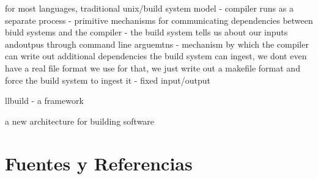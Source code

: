 \documentclass[12pt, a4paper]{report}
\begin{document}
for most languages, traditional unix/build system model
- compiler runs as a separate process
- primitive mechanisms for communicating dependencies between biuld systems and the compiler
  - the build system tells us about our inputs andoutpus through command line arguemtns
  - mechanism by which the compiler can write out additional dependencies the build system can ingest, we dont even have a real file format we use for that, we just write out a makefile format and force the build system to ingest it
  - fixed input/output

llbuild - a framework

a new architecture for building software

\section*{Fuentes y Referencias}
\end{document}
